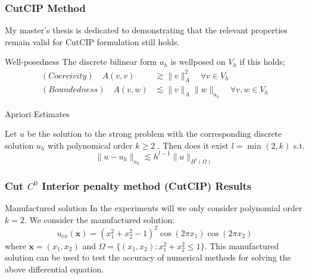\begin{frame}
\frametitle{ CutCIP Method}

My master's thesis is dedicated to demonstrating that the relevant properties remain valid for CutCIP formulation still holds.

    \begin{block}{Well-posedness }
         The discrete bilinear form $a_{h}$ is wellposed on $V_{h}$ if this holds; \[
             \begin{split}
                 (Coercivity) \quad  A( v,v) &  \gtrsim  \| v \|_{A }^{ 2 } \quad  \forall v \in  V_{h} \\
            (Boundedness) \quad A( v,w) & \lesssim  \| v \|_{A }^{  }\| w \|_{a_{h} }^{  } \quad  \forall v,w \in  V_{h}
             \end{split}
        \]
    \end{block}

    \begin{block}{Apriori Estimates }

         Let $u$ be the solution to the strong problem with the corresponding discrete solution $u_{h}$ with polynomical order $k\ge 2$ .
        Then does it exist  $l = \min_{} ( 2, k)  $ s.t.
\[
        \| u - u_{h} \|_{a_{h}  }^{  } \lesssim  h^{l-1} \| u \|_{ H^{l} ( \Omega ) }^{  }
\]
    \end{block}
\end{frame}



\begin{frame}
\frametitle{ Cut $C^0$ Interior penalty method (CutCIP) Results }


\begin{block}{Manufactured solution}
    In the experiments will we only consider polynomial order $k=2$.
We consider the manufactured solution:
$$
u_{ex}(\mathbf{x}) = \left(x_1^2 + x_2^2 - 1\right)^2 \cos(2\pi x_1) \cos(2\pi x_2)
$$
where $\mathbf{x}=(x_1,x_2)$ and $\Omega=\{(x_1,x_2): x_1^2 + x_2^2 \le  1\}$.
This manufactured solution can be used to test the accuracy of numerical methods for solving the above differential equation.
\end{block}
\end{frame}


